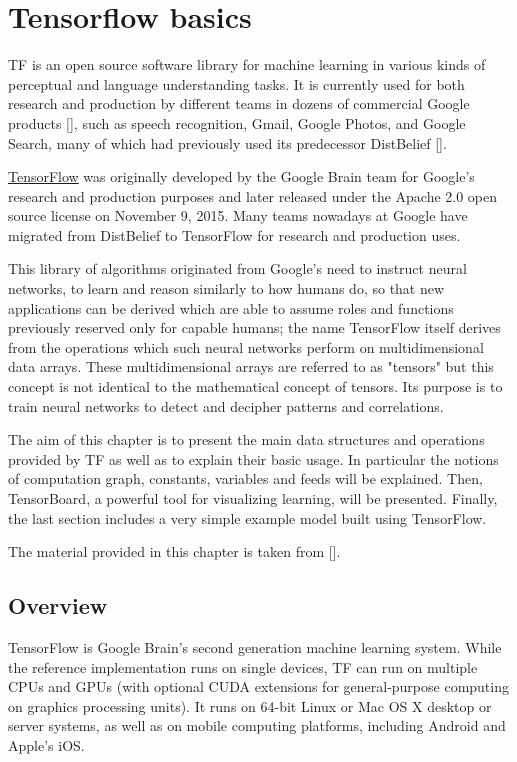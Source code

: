 \chapter{Tensorflow basics}\label{ch:tensorflow_basics}

\ac{TF} is an open source software library for machine learning in various kinds of perceptual and language understanding tasks. It is currently used for both research and production by different teams in dozens of commercial Google products [\cite{DBLP:journals/corr/AbadiABBCCCDDDG16}], such as speech recognition, Gmail, Google Photos, and Google Search, many of which had previously used its predecessor DistBelief [\cite{40565}]. 

\href{https://www.tensorflow.org/}{TensorFlow} was originally developed by the Google Brain team for Google's research and production purposes and later released under the Apache 2.0 open source license on November 9, 2015.  Many teams nowadays at Google have migrated from DistBelief to TensorFlow for research and production uses.

This library of algorithms originated from Google's need to instruct neural networks, to learn and reason similarly to how humans do, so that new applications can be derived which are able to assume roles and functions previously reserved only for capable humans; the name TensorFlow itself derives from the operations which such neural networks perform on multidimensional data arrays. These multidimensional arrays are referred to as "tensors" but this concept is not identical to the mathematical concept of tensors. Its purpose is to train neural networks to detect and decipher patterns and correlations.

The aim of this chapter is to present the main data structures and operations provided by \acs{TF} as well as to explain their basic usage. In particular the notions of computation graph, constants, variables and feeds will be explained. Then, TensorBoard, a powerful tool for visualizing learning, will be presented. Finally, the last section includes a very simple example model built using TensorFlow.

The material provided in this chapter is taken from [\cite{tensorflow}].

\section{Overview}

TensorFlow is Google Brain's second generation machine learning system. While the reference implementation runs on single devices, \ac{TF} can run on multiple \acsp{CPU} and \acsp{GPU} (with optional \acs{CUDA} extensions for general-purpose computing on graphics processing units). It runs on 64-bit Linux or Mac OS X desktop or server systems, as well as on mobile computing platforms, including Android and Apple's iOS.

